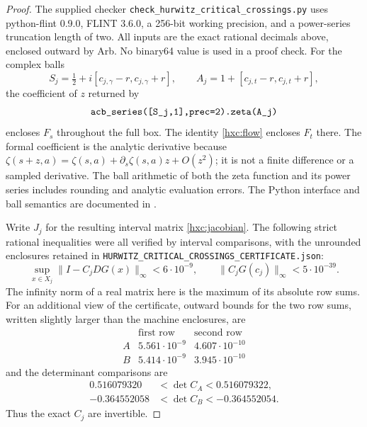 \begin{proof}
The supplied checker
\texttt{check\_\allowbreak hurwitz\_\allowbreak critical\_\allowbreak crossings.py} uses python-flint 0.9.0,
FLINT 3.6.0, a 256-bit working precision, and a power-series truncation
length of two. All inputs are the exact rational decimals above,
enclosed outward by Arb. No binary64 value is used in a proof check.
For the complex balls
\[
 S_j=\tfrac12+i[c_{j,\gamma}-r,c_{j,\gamma}+r],
 \qquad A_j=1+[c_{j,t}-r,c_{j,t}+r],
\]
the coefficient of \(z\) returned by
\[
 \texttt{acb\_\allowbreak series([S\_\allowbreak j,1],prec=2).zeta(A\_\allowbreak j)}
\]
encloses \(F_s\) throughout the full box. The identity
\eqref{hxc:flow} encloses \(F_t\) there. The formal coefficient is the
analytic derivative because
\(\zeta(s+z,a)=\zeta(s,a)+\partial_s\zeta(s,a)z+O(z^2)\);
it is not a finite difference or a sampled derivative. The ball
arithmetic of both the zeta function and its power series includes
rounding and analytic evaluation errors. The Python interface and ball
semantics are documented in \cite{pythonflintseries,pythonflintarb}.

Write \(J_j\) for the resulting interval matrix
\eqref{hxc:jacobian}. The following strict rational inequalities were
all verified by interval comparisons, with the unrounded enclosures
retained in
\texttt{HURWITZ\_\allowbreak CRITICAL\_\allowbreak CROSSINGS\_\allowbreak CERTIFICATE.json}:
\begin{equation}\label{hxc:bounds}
 \sup_{x\in X_j}\|I-C_jDG(x)\|_\infty<6\cdot10^{-9},
 \qquad
 \|C_jG(c_j)\|_\infty<5\cdot10^{-39}.
\end{equation}
The infinity norm of a real matrix here is the maximum of its absolute
row sums. For an additional view of the certificate, outward bounds for
the two row sums, written slightly larger than the machine enclosures,
are
\[
 \begin{array}{c|cc}
  &\text{first row}&\text{second row}\\ \hline
 A&5.561\cdot10^{-9}&4.607\cdot10^{-10}\\
 B&5.414\cdot10^{-9}&3.945\cdot10^{-10}
 \end{array}
\]
and the determinant comparisons are
\begin{align*}
 0.516079320&<\det C_A<0.516079322,\\
 -0.364552058&<\det C_B<-0.364552054.
\end{align*}
Thus the exact \(C_j\) are invertible.


\end{proof}
